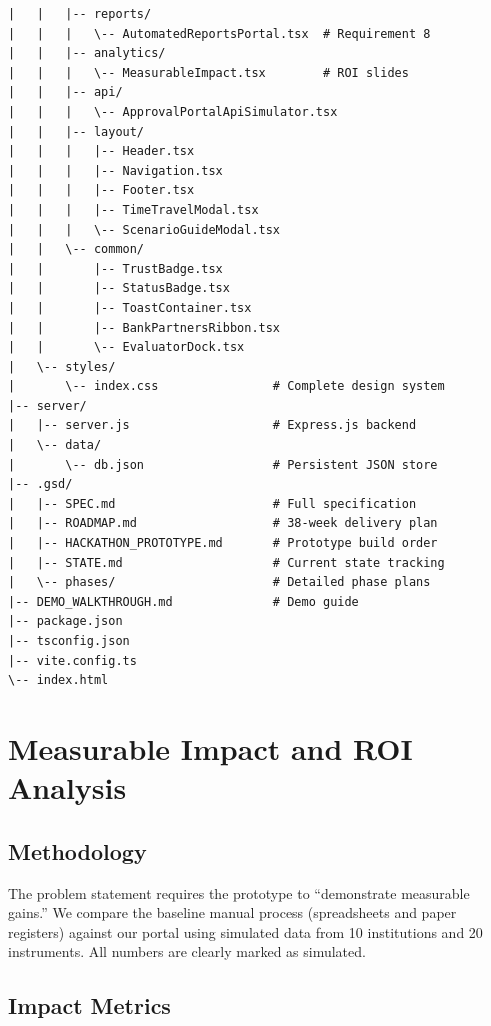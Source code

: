 \documentclass[12pt, a4paper]{report}
\begin{document}
\begin{verbatim}
|   |   |-- reports/
|   |   |   \-- AutomatedReportsPortal.tsx  # Requirement 8
|   |   |-- analytics/
|   |   |   \-- MeasurableImpact.tsx        # ROI slides
|   |   |-- api/
|   |   |   \-- ApprovalPortalApiSimulator.tsx
|   |   |-- layout/
|   |   |   |-- Header.tsx
|   |   |   |-- Navigation.tsx
|   |   |   |-- Footer.tsx
|   |   |   |-- TimeTravelModal.tsx
|   |   |   \-- ScenarioGuideModal.tsx
|   |   \-- common/
|   |       |-- TrustBadge.tsx
|   |       |-- StatusBadge.tsx
|   |       |-- ToastContainer.tsx
|   |       |-- BankPartnersRibbon.tsx
|   |       \-- EvaluatorDock.tsx
|   \-- styles/
|       \-- index.css                # Complete design system
|-- server/
|   |-- server.js                    # Express.js backend
|   \-- data/
|       \-- db.json                  # Persistent JSON store
|-- .gsd/
|   |-- SPEC.md                      # Full specification
|   |-- ROADMAP.md                   # 38-week delivery plan
|   |-- HACKATHON_PROTOTYPE.md       # Prototype build order
|   |-- STATE.md                     # Current state tracking
|   \-- phases/                      # Detailed phase plans
|-- DEMO_WALKTHROUGH.md              # Demo guide
|-- package.json
|-- tsconfig.json
|-- vite.config.ts
\-- index.html
\end{verbatim}



\chapter{Measurable Impact and ROI Analysis}

\section{Methodology}

\begin{connectionbox}
The problem statement requires the prototype to ``demonstrate measurable gains.'' We compare the baseline manual process (spreadsheets and paper registers) against our portal using simulated data from 10 institutions and 20 instruments. All numbers are clearly marked as simulated.
\end{connectionbox}

\section{Impact Metrics}
\end{document}

